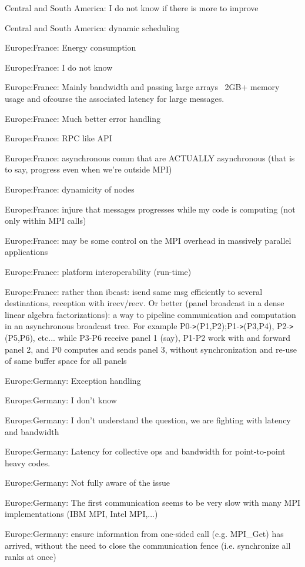 \item Central and South America: I do not know if there is more to improve
\item Central and South America: dynamic scheduling
\item Europe:France: Energy consumption
\item Europe:France: I do not know
\item Europe:France: Mainly bandwidth and passing large arrays ~2GB+ memory usage and ofcourse the associated latency for large messages.
\item Europe:France: Much better error handling
\item Europe:France: RPC like API
\item Europe:France: asynchronous comm that are ACTUALLY asynchronous (that is to say, progress even when we're outside MPI)
\item Europe:France: dynamicity of nodes
\item Europe:France: injure that messages progresses while my code is computing (not only within MPI calls)
\item Europe:France: may be some control on the MPI overhead in massively parallel applications
\item Europe:France: platform interoperability (run-time)
\item Europe:France: rather than ibcast: isend same msg efficiently to several destinations, reception with irecv/recv. Or better (panel broadcast in a dense linear algebra factorizations): a way to pipeline communication and computation in an asynchronous broadcast tree. For example P0-\verb!>!(P1,P2);P1-\verb!>!(P3,P4), P2-\verb!>!(P5,P6), etc... while P3-P6 receive panel 1 (say), P1-P2  work with and forward panel 2, and P0 computes and sends panel 3, without synchronization and re-use of same buffer space for all panels
\item Europe:Germany: Exception handling
\item Europe:Germany: I don't know
\item Europe:Germany: I don't understand the question, we are fighting with latency and bandwidth
\item Europe:Germany: Latency for collective ops and bandwidth for point-to-point heavy codes.
\item Europe:Germany: Not fully aware of the issue
\item Europe:Germany: The first communication seems to be very slow with many MPI implementations (IBM MPI, Intel MPI,...)
\item Europe:Germany: ensure information from one-sided call (e.g. MPI\_Get) has arrived, without the need to close the communication fence (i.e. synchronize all ranks at once)

